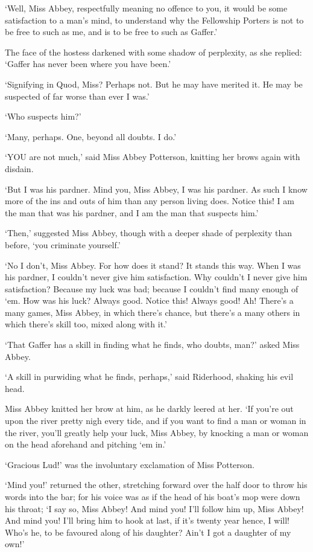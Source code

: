 ‘Well, Miss Abbey, respectfully meaning no offence to you, it would
be some satisfaction to a man’s mind, to understand why the Fellowship
Porters is not to be free to such as me, and is to be free to such as
Gaffer.’

The face of the hostess darkened with some shadow of perplexity, as she
replied: ‘Gaffer has never been where you have been.’

‘Signifying in Quod, Miss? Perhaps not. But he may have merited it. He
may be suspected of far worse than ever I was.’

‘Who suspects him?’

‘Many, perhaps. One, beyond all doubts. I do.’

‘YOU are not much,’ said Miss Abbey Potterson, knitting her brows again
with disdain.

‘But I was his pardner. Mind you, Miss Abbey, I was his pardner. As
such I know more of the ins and outs of him than any person living does.
Notice this! I am the man that was his pardner, and I am the man that
suspects him.’

‘Then,’ suggested Miss Abbey, though with a deeper shade of perplexity
than before, ‘you criminate yourself.’

‘No I don’t, Miss Abbey. For how does it stand? It stands this way. When
I was his pardner, I couldn’t never give him satisfaction. Why couldn’t
I never give him satisfaction? Because my luck was bad; because I
couldn’t find many enough of ‘em. How was his luck? Always good. Notice
this! Always good! Ah! There’s a many games, Miss Abbey, in which
there’s chance, but there’s a many others in which there’s skill too,
mixed along with it.’

‘That Gaffer has a skill in finding what he finds, who doubts, man?’
asked Miss Abbey.

‘A skill in purwiding what he finds, perhaps,’ said Riderhood, shaking
his evil head.

Miss Abbey knitted her brow at him, as he darkly leered at her. ‘If
you’re out upon the river pretty nigh every tide, and if you want to
find a man or woman in the river, you’ll greatly help your luck, Miss
Abbey, by knocking a man or woman on the head aforehand and pitching ‘em
in.’

‘Gracious Lud!’ was the involuntary exclamation of Miss Potterson.

‘Mind you!’ returned the other, stretching forward over the half door
to throw his words into the bar; for his voice was as if the head of his
boat’s mop were down his throat; ‘I say so, Miss Abbey! And mind you!
I’ll follow him up, Miss Abbey! And mind you! I’ll bring him to hook at
last, if it’s twenty year hence, I will! Who’s he, to be favoured along
of his daughter? Ain’t I got a daughter of my own!’

